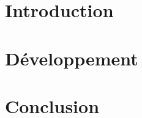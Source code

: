 \documentclass[a4paper,11pt,final,oneside]{article}
\begin{document}
  
  \cleardoublepage %
  \sloppy          %

  \part{Introduction}
  
  
  \cleardoublepage
  
  \cleardoublepage
  
  \cleardoublepage
  
  \cleardoublepage


  \part{Développement}

  
  \cleardoublepage
  
  \cleardoublepage


  \part{Conclusion}

  
  \cleardoublepage
  
  \cleardoublepage
  
  \cleardoublepage
  
\end{document}
